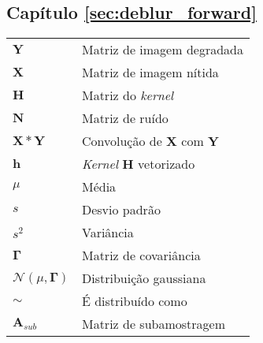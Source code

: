 \begin{multicols}{2}
\subsection*{Capítulo \ref{sec:deblur_forward}}
\noindent\begin{tabular}{ m{1.3cm} m{6.2cm}}
$\mathbf{Y}$ &Matriz de imagem degradada\\
$\mathbf{X}$ &Matriz de imagem nítida\\
$\mathbf{H}$ &Matriz do \textit{kernel}\\
$\mathbf{N}$ &Matriz de ruído\\
$\mathbf{X} * \mathbf{Y} $ &  Convolução de $\mathbf{X}$ com $\mathbf{Y}$\\
$\mathbf{h}$ &\textit{Kernel} $\mathbf{H}$ vetorizado  \\
$\mu$ & Média \\
$s$ & Desvio padrão\\ 
$s^2$ & Variância\\ 
$\mathbf{\Gamma}$ & Matriz de covariância \\
$\mathcal{N}(\mu,\mathbf{\Gamma})$ &Distribuição gaussiana \\
$\sim$ & É distribuído como  \\
$\mathbf{A}_{sub}$& Matriz de subamostragem\\
\end{tabular}

\vfill


\end{multicols}

